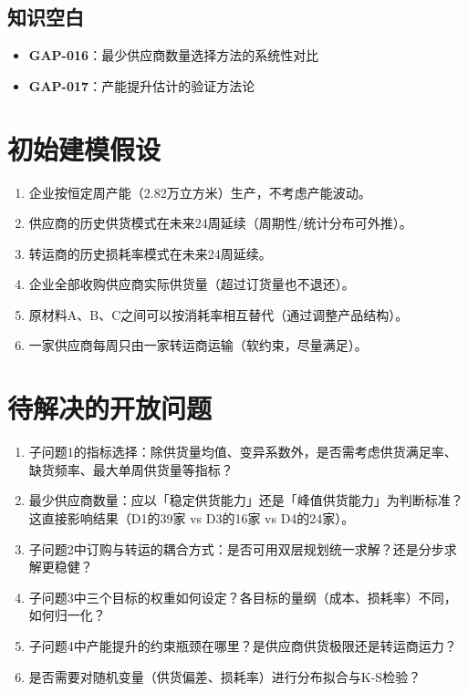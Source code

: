 \documentclass{internal-report}
\begin{document}
\subsection{知识空白}
\begin{itemize}
  \item \textbf{GAP-016}：最少供应商数量选择方法的系统性对比
  \item \textbf{GAP-017}：产能提升估计的验证方法论
\end{itemize}

\section{初始建模假设}

\begin{enumerate}
  \item 企业按恒定周产能（2.82万立方米）生产，不考虑产能波动。
  \item 供应商的历史供货模式在未来24周延续（周期性/统计分布可外推）。
  \item 转运商的历史损耗率模式在未来24周延续。
  \item 企业全部收购供应商实际供货量（超过订货量也不退还）。
  \item 原材料A、B、C之间可以按消耗率相互替代（通过调整产品结构）。
  \item 一家供应商每周只由一家转运商运输（软约束，尽量满足）。
\end{enumerate}

\section{待解决的开放问题}

\begin{enumerate}
  \item 子问题1的指标选择：除供货量均值、变异系数外，是否需考虑供货满足率、缺货频率、最大单周供货量等指标？
  \item 最少供应商数量：应以「稳定供货能力」还是「峰值供货能力」为判断标准？这直接影响结果（D1的39家 vs D3的16家 vs D4的24家）。
  \item 子问题2中订购与转运的耦合方式：是否可用双层规划统一求解？还是分步求解更稳健？
  \item 子问题3中三个目标的权重如何设定？各目标的量纲（成本、损耗率）不同，如何归一化？
  \item 子问题4中产能提升的约束瓶颈在哪里？是供应商供货极限还是转运商运力？
  \item 是否需要对随机变量（供货偏差、损耗率）进行分布拟合与K-S检验？
\end{enumerate}
\end{document}
